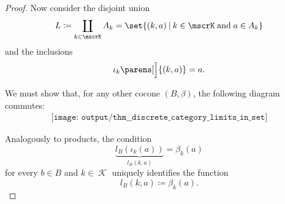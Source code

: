 \begin{proof}
   Now consider the disjoint union
  \begin{equation*}
    L \coloneqq \coprod_{k \in \mscrK} A_k = \set{ (k, a) \given k \in \mscrK \T{and} a \in A_k }
  \end{equation*}
  and the inclusions
  \begin{equation*}
    \iota_k\parens[\Big]{ (k, a) } = a.
  \end{equation*}

  We must show that, for any other cocone \( (B, \beta) \), the following diagram commutes:
  \begin{equation}\label{eq:thm:discrete_category_limits_in_set/colimit}
    \begin{aligned}
      \texttt{[image: output/thm\_\_discrete\_category\_limits\_in\_set]}
    \end{aligned}
  \end{equation}

  Analogously to products, the condition
  \begin{equation*}
    \underbrace{ l_B(\iota_k(a)) }_{l_B(k, a)} = \beta_k(a)
  \end{equation*}
  for every \( b \in B \) and \( k \in \mscrK \) uniquely identifies the function
  \begin{equation*}
    l_B(k, a) \coloneqq \beta_k(a).
  \end{equation*}
\end{proof}

